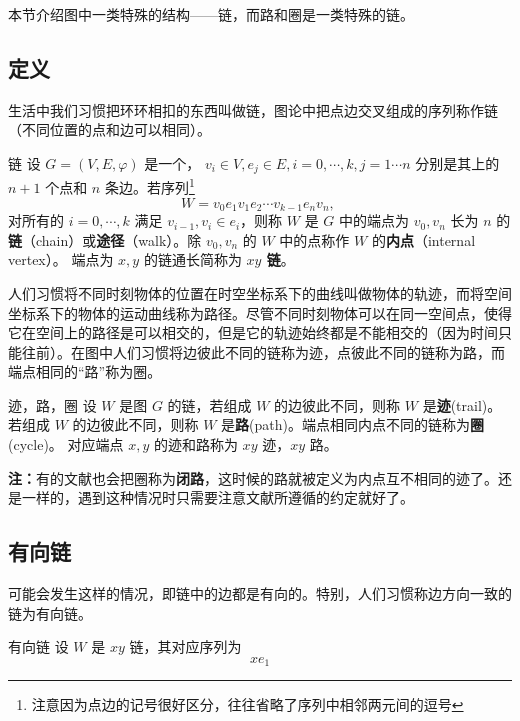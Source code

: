 
本节介绍图中一类特殊的结构——链，而路和圈是一类特殊的链。

\subsection{定义}
生活中我们习惯把环环相扣的东西叫做链，图论中把点边交叉组成的序列称作链（不同位置的点和边可以相同）。

\begin{definition}{链}
设 $G=(V,E,\varphi)$ 是一个， $v_i\in V,e_j\in E,i=0,\cdots,k,j=1\cdots n$ 分别是其上的 $n+1$ 个点和 $n$ 条边。若序列\footnote{注意因为点边的记号很好区分，往往省略了序列中相邻两元间的逗号}
\begin{equation}
W=v_0 e_1v_1e_2\cdots v_{k-1} e_nv_n,~
\end{equation}
对所有的 $i=0,\cdots,k$ 满足 $v_{i-1},v_{i}\in e_{i}$，则称 $W$ 是 $G$ 中的端点为 $v_0,v_n$ 长为 $n$ 的\textbf{链}（chain）或\textbf{途径}（walk）。除 $v_0,v_n$ 的 $W$ 中的点称作 $W$ 的\textbf{内点}（internal vertex）。 端点为 $x,y$ 的链通长简称为 \textbf{$xy$ 链}。
\end{definition}
人们习惯将不同时刻物体的位置在时空坐标系下的曲线叫做物体的轨迹，而将空间坐标系下的物体的运动曲线称为路径。尽管不同时刻物体可以在同一空间点，使得它在空间上的路径是可以相交的，但是它的轨迹始终都是不能相交的（因为时间只能往前）。在图中人们习惯将边彼此不同的链称为迹，点彼此不同的链称为路，而端点相同的“路”称为圈。
\begin{definition}{迹，路，圈}
设 $W$ 是图 $G$ 的链，若组成 $W$ 的边彼此不同，则称 $W$ 是\textbf{迹}(trail)。若组成 $W$ 的边彼此不同，则称 $W$ 是\textbf{路}(path)。端点相同内点不同的链称为\textbf{圈}(cycle)。 对应端点 $x,y$ 的迹和路称为 $xy$ 迹，$xy$ 路。
\end{definition}
\textbf{注：}有的文献也会把圈称为\textbf{闭路}，这时候的路就被定义为内点互不相同的迹了。还是一样的，遇到这种情况时只需要注意文献所遵循的约定就好了。

\subsection{有向链}

可能会发生这样的情况，即链中的边都是有向的。特别，人们习惯称边方向一致的链为有向链。
\begin{definition}{有向链}
设 $W$ 是 $xy$ 链，其对应序列为
\begin{equation}
xe_1
\end{equation}

\end{definition}






 







